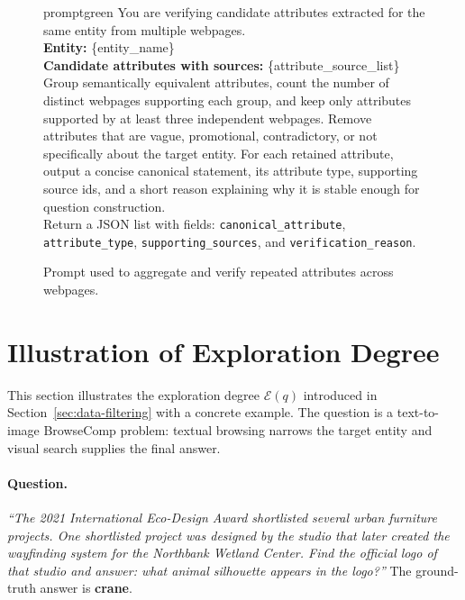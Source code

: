 \begin{figure}[H]
\centering
\begin{promptbox}{promptgreen}
You are verifying candidate attributes extracted for the same entity from multiple webpages.\\
\textbf{Entity:} \{entity\_name\}\\
\textbf{Candidate attributes with sources:} \{attribute\_source\_list\}\\[2pt]
Group semantically equivalent attributes, count the number of distinct webpages supporting each group, and keep only attributes supported by at least three independent webpages. Remove attributes that are vague, promotional, contradictory, or not specifically about the target entity. For each retained attribute, output a concise canonical statement, its attribute type, supporting source ids, and a short reason explaining why it is stable enough for question construction.\\[2pt]
Return a JSON list with fields:
\texttt{canonical\_attribute}, \texttt{attribute\_type}, \texttt{supporting\_sources}, and \texttt{verification\_reason}.
\end{promptbox}
\caption{Prompt used to aggregate and verify repeated attributes across webpages.}
\label{fig:web-attr-aggregate-prompt}
\end{figure}

\clearpage


\section{Illustration of Exploration Degree}
\label{app:exploration-degree-example}

This section illustrates the exploration degree $\mathcal{E}(q)$ introduced in Section~\ref{sec:data-filtering} with a concrete example. The question is a text-to-image BrowseComp problem: textual browsing narrows the target entity and visual search supplies the final answer.

\paragraph{Question.}
\textit{``The 2021 International Eco-Design Award shortlisted several urban furniture projects. One shortlisted project was designed by the studio that later created the wayfinding system for the Northbank Wetland Center. Find the official logo of that studio and answer: what animal silhouette appears in the logo?''}
The ground-truth answer is \textbf{crane}.

